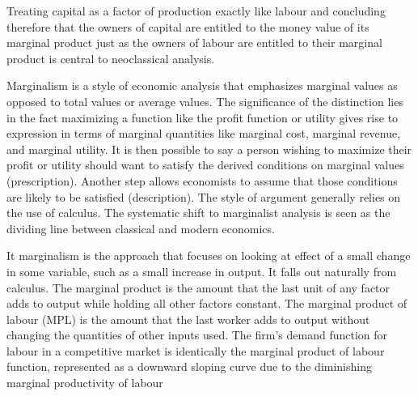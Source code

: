 

Treating  capital as a factor of production exactly like labour and concluding therefore that the owners of capital are entitled to the money value of its \gls{marginal product} just as the owners of labour are entitled to their marginal product is central to neoclassical analysis.

Marginalism is a style of economic analysis that emphasizes marginal values as opposed to total values or average values. The significance of the distinction lies in the fact maximizing a function like the profit function or utility gives rise to expression in terms of marginal quantities like marginal cost, marginal revenue, and marginal utility. It is then possible to say a person wishing to maximize their profit or utility should want to satisfy the derived conditions on marginal values (prescription). Another step allows economists to assume that those conditions are likely to be satisfied (description). The style of argument generally relies on the use of calculus. The systematic shift to marginalist analysis is seen as the dividing line between classical and modern economics.

It \gls{marginalism} is the approach that focuses on looking at effect of a small change in some variable,  such as a small increase in output. It falls out naturally from calculus. 
The marginal product is the amount that the last unit of any factor adds to output while holding all other factors constant. 
The marginal product of labour (MPL) is the amount that the last worker adds to output without changing the quantities of other inputs used. The firm’s demand function for labour in a competitive market is identically the marginal product of labour function, represented as a downward sloping curve due to the diminishing marginal productivity of labour %

